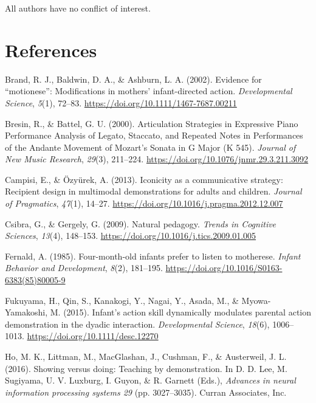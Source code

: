 \documentclass[
  english,
  man,floatsintext]{apa6}
\newlength{\cslhangindent}
\newenvironment{cslreferences}%
  {\setlength{\parindent}{0pt}%
  \everypar{\setlength{\hangindent}{\cslhangindent}}\ignorespaces}%
  {\par}
\begin{document}
All authors have no conflict of interest.

\newpage

\hypertarget{references}{%
\section{References}\label{references}}

\begingroup
\setlength{\parindent}{-0in}
\setlength{\leftskip}{0in}

\hypertarget{refs}{}
\begin{cslreferences}
\leavevmode\hypertarget{ref-brand_2002}{}%
Brand, R. J., Baldwin, D. A., \& Ashburn, L. A. (2002). Evidence for ``motionese'': Modifications in mothers' infant-directed action. \emph{Developmental Science}, \emph{5}(1), 72--83. \url{https://doi.org/10.1111/1467-7687.00211}

\leavevmode\hypertarget{ref-bresin_2000}{}%
Bresin, R., \& Battel, G. U. (2000). Articulation Strategies in Expressive Piano Performance Analysis of Legato, Staccato, and Repeated Notes in Performances of the Andante Movement of Mozart's Sonata in G Major (K 545). \emph{Journal of New Music Research}, \emph{29}(3), 211--224. \url{https://doi.org/10.1076/jnmr.29.3.211.3092}

\leavevmode\hypertarget{ref-campisi_2013}{}%
Campisi, E., \& Özyürek, A. (2013). Iconicity as a communicative strategy: Recipient design in multimodal demonstrations for adults and children. \emph{Journal of Pragmatics}, \emph{47}(1), 14--27. \url{https://doi.org/10.1016/j.pragma.2012.12.007}

\leavevmode\hypertarget{ref-csibra_2009}{}%
Csibra, G., \& Gergely, G. (2009). Natural pedagogy. \emph{Trends in Cognitive Sciences}, \emph{13}(4), 148--153. \url{https://doi.org/10.1016/j.tics.2009.01.005}

\leavevmode\hypertarget{ref-fernald_1985}{}%
Fernald, A. (1985). Four-month-old infants prefer to listen to motherese. \emph{Infant Behavior and Development}, \emph{8}(2), 181--195. \url{https://doi.org/10.1016/S0163-6383(85)80005-9}

\leavevmode\hypertarget{ref-fukuyama_2015}{}%
Fukuyama, H., Qin, S., Kanakogi, Y., Nagai, Y., Asada, M., \& Myowa-Yamakoshi, M. (2015). Infant's action skill dynamically modulates parental action demonstration in the dyadic interaction. \emph{Developmental Science}, \emph{18}(6), 1006--1013. \url{https://doi.org/10.1111/desc.12270}

\leavevmode\hypertarget{ref-NIPS2016_6413}{}%
Ho, M. K., Littman, M., MacGlashan, J., Cushman, F., \& Austerweil, J. L. (2016). Showing versus doing: Teaching by demonstration. In D. D. Lee, M. Sugiyama, U. V. Luxburg, I. Guyon, \& R. Garnett (Eds.), \emph{Advances in neural information processing systems 29} (pp. 3027--3035). Curran Associates, Inc.


\end{cslreferences}
\end{document}
